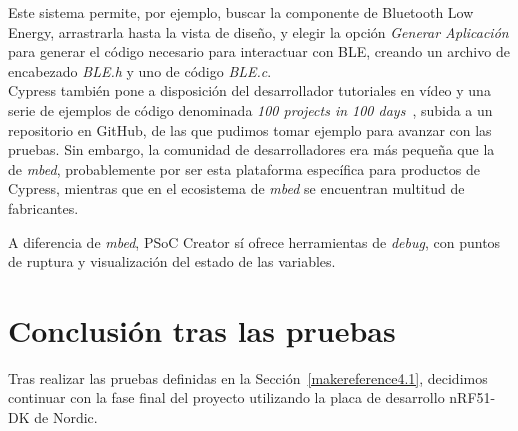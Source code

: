 Este sistema permite, por ejemplo, buscar la componente de Bluetooth Low Energy, arrastrarla hasta la vista de diseño, y elegir la opción \textit{Generar Aplicación} para generar el código necesario para interactuar con BLE, creando un archivo de encabezado \textit{BLE.h} y uno de código \textit{BLE.c}.\\

Cypress también pone a disposición del desarrollador tutoriales en vídeo y una serie de ejemplos de código denominada \textit{100 projects in 100 days}~\cite{100Projects}, subida a un repositorio en GitHub, de las que pudimos tomar ejemplo para avanzar con las pruebas.
Sin embargo, la comunidad de desarrolladores era más pequeña que la de \emph{mbed}, probablemente por ser esta plataforma específica para productos de Cypress, mientras que en el ecosistema de \emph{mbed} se encuentran multitud de fabricantes.

A diferencia de \emph{mbed}, PSoC Creator sí ofrece herramientas de \textit{debug}, con puntos de ruptura y visualización del estado de las variables.

\section{Conclusión tras las pruebas}
\label{makereference4.3}

Tras realizar las pruebas definidas en la Sección~\ref{makereference4.1}, decidimos continuar con la fase final del proyecto utilizando la placa de desarrollo nRF51-DK de Nordic.
